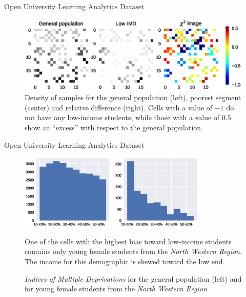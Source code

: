 \documentclass[10pt,compress]{beamer}
\begin{document}
\begin{frame}{Open University Learning Analytics Dataset}
\begin{figure}[t]
    \centering
    \includegraphics[width=\textwidth]{imd}
    \caption[Comparing  density variations.]{Density of samples for the general population (left), poorest segment (center) and
    relative difference (right). Cells with a value of $-1$ do not have any low-income students,
    while those with a value of $0.5$ show an ``excess'' with respect to the general
    population.}
\end{figure}
    \cite{kuzilek_open_2017}
\end{frame}

\begin{frame}{Open University Learning Analytics Dataset}
\begin{figure}[htbp]
    \centering
    \includegraphics[width=0.8\textwidth]{imd_histogram}
    \caption[Histogram of the  for two populations.]{
        \emph{Indices of Multiple Deprivations} for the general population (left) and for
        young female students from the \emph{North Western Region}.
    }
    \begin{block}{}
    One of the cells with the highest bias toward low-income students
    contains only young female students from the \emph{North Western Region}.
    The income for this demographic is skewed toward the low end.
    \end{block}
\end{figure}
\end{frame}
\end{document}
